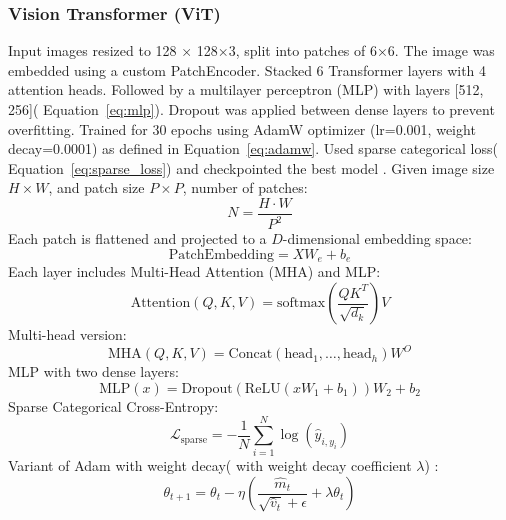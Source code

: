 \documentclass{ijclclp}
\begin{document}
    \subsubsection{Vision Transformer (ViT)}
    Input images resized to 128 × 128×3, split into patches of 6×6. The image was embedded using a custom PatchEncoder. Stacked 6 Transformer layers with 4 attention heads. Followed by a multilayer perceptron (MLP) with layers [512, 256]( Equation~\eqref{eq:mlp}). Dropout was applied between dense layers to prevent overfitting. Trained for 30 epochs using AdamW optimizer (lr=0.001, weight decay=0.0001) as defined in Equation~\eqref{eq:adamw}. Used sparse categorical loss( Equation~\eqref{eq:sparse_loss}) and checkpointed the best model \cite{xu2023automatic,vitmedium}.
\newline
Given image size \( H \times W \), and patch size \( P \times P \), number of patches:
    \begin{equation}
    N = \frac{H \cdot W}{P^2}
    \label{eq:num_patches}
    \end{equation}
\newline
Each patch is flattened and projected to a $D$-dimensional embedding space:
    \begin{equation}
    \text{PatchEmbedding} = XW_e + b_e
    \label{eq:patch_embedding}
    \end{equation}
\newline
Each layer includes Multi-Head Attention (MHA) and MLP:
    \begin{equation}
    \text{Attention}(Q, K, V) = \text{softmax}\left(\frac{QK^T}{\sqrt{d_k}}\right)V
    \label{eq:attention}
    \end{equation}
\newline
Multi-head version:
    \begin{equation}
    \text{MHA}(Q, K, V) = \text{Concat}(\text{head}_1, \dots, \text{head}_h)W^O
    \label{eq:mha}
    \end{equation}
\newline
MLP with two dense layers:
    \begin{equation}
    \text{MLP}(x) = \text{Dropout}(\text{ReLU}(xW_1 + b_1))W_2 + b_2
    \label{eq:mlp}
    \end{equation}
\newline
Sparse Categorical Cross-Entropy:
    \begin{equation}
    \mathcal{L}_{\text{sparse}} = -\frac{1}{N} \sum_{i=1}^{N} \log(\hat{y}_{i, y_i})
    \label{eq:sparse_loss}
    \end{equation}
\newline
Variant of Adam with weight decay( with weight decay coefficient \( \lambda \)) :
    \begin{equation}
    \theta_{t+1} = \theta_t - \eta \left( \frac{\hat{m}_t}{\sqrt{\hat{v}_t} + \epsilon} + \lambda \theta_t \right)
    \label{eq:adamw}
    \end{equation}
\end{document}
